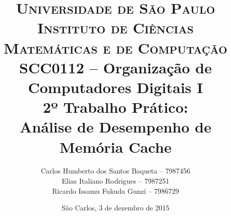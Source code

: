\begin{titlepage}

		\title{
\textsc {\large{Universidade de São Paulo\\
Instituto de Ciências Matemáticas e de Computação}}\\[1cm]
\large{SCC0112 -- Organização de Computadores Digitais I}\\[5cm]
\LARGE{2º Trabalho Prático:}\\[0.5cm]
\LARGE{Análise de Desempenho de Memória Cache}\\[4cm]
		}

		\author{
Carlos Humberto dos Santos Baqueta -- 7987456\\
Elias Italiano Rodrigues -- 7987251\\
Ricardo Issamu Fukuda Gunzi -- 7986729
		}

		\date{
\vfill São Carlos, 3 de dezembro de 2015
		}

		\maketitle
		\thispagestyle{empty}

\end{titlepage}

